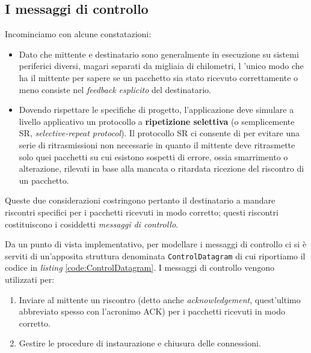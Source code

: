 \documentclass[10pt,a4paper, titlepage]{report}
\begin{document}
\subsection{I messaggi di controllo}

Incominciamo con alcune constatazioni: 

\begin{itemize}
\item Dato che mittente e destinatario sono generalmente in esecuzione su sistemi periferici diversi, magari separati da migliaia di chilometri, l 'unico modo che ha il mittente per sapere se un pacchetto sia stato ricevuto correttamente o meno consiste nel \textit{feedback esplicito} del destinatario.
\item Dovendo rispettare le specifiche di progetto, l'applicazione deve simulare a livello applicativo un protocollo a \textbf{ripetizione selettiva} (o semplicemente SR, \textit{selective-repeat protocol}). Il protocollo SR ci consente di per evitare una serie di ritrasmissioni non necessarie in quanto il mittente deve ritrasmette solo quei pacchetti su cui esistono sospetti di errore, ossia smarrimento o alterazione, rilevati in base alla mancata o ritardata ricezione del riscontro di un pacchetto.

\end{itemize}

Queste due considerazioni costringono pertanto il destinatario a mandare riscontri specifici per i pacchetti ricevuti in modo corretto; questi riscontri costituiscono i cosiddetti \textit{messaggi di controllo}.

Da un punto di vista implementativo, per modellare i messaggi di controllo ci si è serviti di un'apposita struttura denominata \texttt{ControlDatagram} di cui riportiamo il codice in \textit{listing} \ref{code:ControlDatagram}. I messaggi di controllo vengono utilizzati per:

\begin{enumerate}
\item Inviare al mittente un riscontro (detto anche \textit{acknowledgement}, quest'ultimo abbreviato spesso con l'acronimo ACK) per i pacchetti ricevuti in modo corretto.
\item Gestire le procedure di instaurazione e chiusura delle connessioni.
\end{enumerate}
\end{document}
